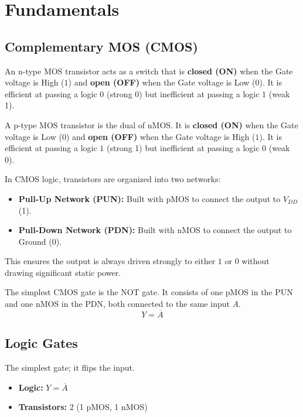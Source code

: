 \section{Fundamentals}

\subsection{Complementary MOS (CMOS)}
\begin{definition}
An n-type MOS transistor acts as a switch that is \textbf{closed (ON)} when the Gate voltage is High ($1$) and \textbf{open (OFF)} when the Gate voltage is Low ($0$). It is efficient at passing a logic $0$ (strong 0) but inefficient at passing a logic $1$ (weak 1).
\end{definition}

\begin{definition}
A p-type MOS transistor is the dual of nMOS. It is \textbf{closed (ON)} when the Gate voltage is Low ($0$) and \textbf{open (OFF)} when the Gate voltage is High ($1$). It is efficient at passing a logic $1$ (strong 1) but inefficient at passing a logic $0$ (weak 0).
\end{definition}

\begin{definition}
In CMOS logic, transistors are organized into two networks:
\begin{itemize}
    \item \textbf{Pull-Up Network (PUN):} Built with pMOS to connect the output to $V_{DD}$ (1).
    \item \textbf{Pull-Down Network (PDN):} Built with nMOS to connect the output to Ground (0).
\end{itemize}
This ensures the output is always driven strongly to either $1$ or $0$ without drawing significant static power.
\end{definition}

\begin{example}
The simplest CMOS gate is the NOT gate. It consists of one pMOS in the PUN and one nMOS in the PDN, both connected to the same input $A$.
$$Y = \overline{A}$$
\end{example}

\subsection{Logic Gates}

\begin{definition}
The simplest gate; it flips the input.
\begin{itemize}
    \item \textbf{Logic:} $Y = \overline{A}$
    \item \textbf{Transistors:} 2 (1 pMOS, 1 nMOS)
\end{itemize}
\end{definition}


